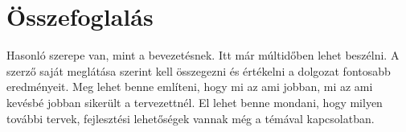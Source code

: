 \chapter{Összefoglalás}

Hasonló szerepe van, mint a bevezetésnek.
Itt már múltidőben lehet beszélni.
A szerző saját meglátása szerint kell összegezni és értékelni a dolgozat fontosabb eredményeit.
Meg lehet benne említeni, hogy mi az ami jobban, mi az ami kevésbé jobban sikerült a tervezettnél.
El lehet benne mondani, hogy milyen további tervek, fejlesztési lehetőségek vannak még a témával kapcsolatban.
